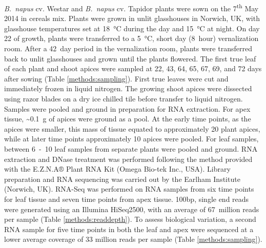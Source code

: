 \documentclass[12pt,]{book}
\begin{document}
\emph{B.~napus} cv. Westar and \emph{B.~napus} cv. Tapidor plants were
sown on the 7\textsuperscript{th} May 2014 in cereals mix. Plants were
grown in unlit glasshouses in Norwich, UK, with glasshouse temperatures
set at 18~°C during the day and 15~°C at night. On day 22 of growth,
plants were transferred to a 5~°C, short day (8~hour) vernalization
room. After a 42~day period in the vernalization room, plants were
transferred back to unlit glasshouses and grown until the plants
flowered. The first true leaf of each plant and shoot apices were
sampled at 22, 43, 64, 65, 67, 69, and 72 days after sowing (Table
\ref{methods:sampling}). First true leaves were cut and immediately
frozen in liquid nitrogen. The growing shoot apices were dissected using
razor blades on a dry ice chilled tile before transfer to liquid
nitrogen. Samples were pooled and ground in preparation for RNA
extraction. For apex tissue, \textasciitilde{}0.1~g of apices were
ground as a pool. At the early time points, as the apices were smaller,
this mass of tissue equated to approximately 20 plant apices, while at
later time points approximately 10 apices were pooled. For leaf samples,
between 6~-~10 leaf samples from separate plants were pooled and ground.
RNA extraction and DNase treatment was performed following the method
provided with the E.Z.N.A® Plant RNA Kit (Omega Bio-tek Inc., USA).
Library preparation and RNA sequencing was carried out by the Earlham
Institute (Norwich, UK). RNA-Seq was performed on RNA samples from six
time points for leaf tissue and seven time points from apex tissue.
100bp, single end reads were generated using an Illumina HiSeq2500, with
an average of 67~million reads per sample (Table
\ref{methods:readdepth}). To assess biological variation, a second RNA
sample for five time points in both the leaf and apex were sequenced at
a lower average coverage of 33 million reads per sample (Table
\ref{methods:sampling}).
\end{document}
